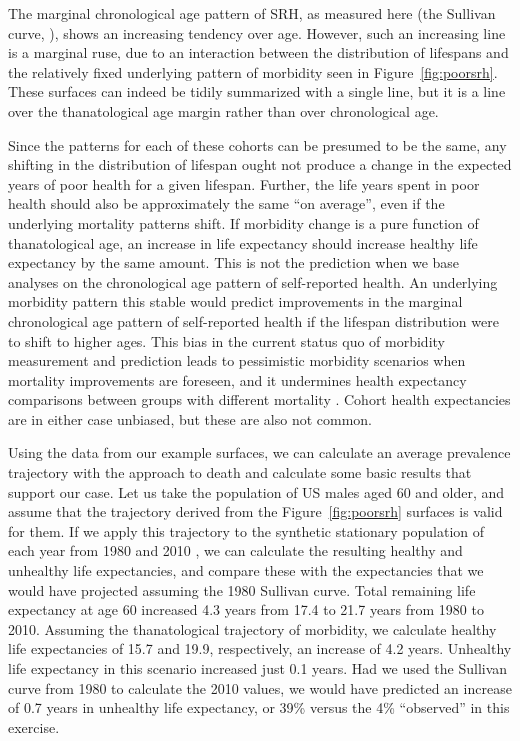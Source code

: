 \documentclass[12pt,oneside,a4paper]{article} %
\begin{document}
The marginal chronological age pattern of SRH, as measured
here (the Sullivan curve, \citep{Sullivan1970}), shows an increasing tendency
over age.
However, such an increasing line is a marginal ruse, due to an interaction
between the distribution of lifespans and the relatively fixed underlying
pattern of morbidity seen in Figure~\ref{fig:poorsrh}. These surfaces can indeed
be tidily summarized with a single line, but it is a line over the
thanatological age margin rather than over chronological age. 

Since the patterns for each of these cohorts can be presumed to be the same, any
shifting in the distribution of lifespan ought not produce a change in the
expected years of poor health for a given lifespan. Further, the life years
spent in poor health should also be approximately the same ``on average'', even
if the underlying mortality patterns shift. If morbidity change is a pure
function of thanatological age, an increase in life expectancy should increase
healthy life expectancy by the same amount. This is not the prediction when we
base analyses on the chronological age pattern of self-reported health. An
underlying morbidity pattern this stable would predict improvements in the
marginal chronological age pattern of self-reported health if the lifespan
distribution were to shift to higher ages. This bias in the current status quo
of morbidity measurement and prediction leads to pessimistic morbidity scenarios
when mortality improvements are foreseen, and it undermines health expectancy
comparisons between groups with different mortality \citep{vanRaalte2015HLE}.
Cohort health expectancies are in either case unbiased, but these are also not common.

Using the data from our example surfaces, we can calculate an average prevalence
trajectory with the approach to death and calculate some basic results that
support our case. Let us take the population of US males aged 60 and older, and
assume that the trajectory derived from the Figure~\ref{fig:poorsrh} surfaces
is valid for them.
If we apply this trajectory to the synthetic stationary population of each
year from 1980 and 2010 , we can calculate the resulting healthy
and unhealthy life expectancies, and compare these with the expectancies that we would have projected assuming the 1980 Sullivan curve.
Total remaining life expectancy at age 60 increased 4.3 years from 17.4 to 21.7
years from 1980 to 2010. Assuming the thanatological trajectory of
morbidity, we calculate healthy life expectancies of 15.7 and 19.9,
respectively, an increase of 4.2 years. Unhealthy life expectancy in this
scenario increased just 0.1 years. Had we used the Sullivan curve from 1980 to
calculate the 2010 values, we would have predicted an increase of 0.7 years in
unhealthy life expectancy, or 39\% versus the 4\% ``observed'' in this
exercise.
\end{document}
